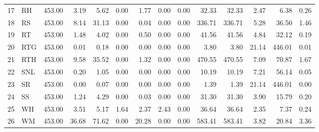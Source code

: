 \begin{table}[ht]
\begin{tabular}{rlrrrrrrrrrrrr}
  17 & RH & 453.00 & 3.19 & 5.62 & 0.00 & 1.77 & 0.00 & 0.00 & 32.33 & 32.33 & 2.47 & 6.38 & 0.26 \\ 
  18 & RS & 453.00 & 8.14 & 31.13 & 0.00 & 0.04 & 0.00 & 0.00 & 336.71 & 336.71 & 5.28 & 36.50 & 1.46 \\ 
  19 & RT & 453.00 & 1.48 & 4.02 & 0.00 & 0.50 & 0.00 & 0.00 & 41.56 & 41.56 & 4.84 & 32.12 & 0.19 \\ 
  20 & RTG & 453.00 & 0.01 & 0.18 & 0.00 & 0.00 & 0.00 & 0.00 & 3.80 & 3.80 & 21.14 & 446.01 & 0.01 \\ 
  21 & RTH & 453.00 & 9.58 & 35.52 & 0.00 & 1.32 & 0.00 & 0.00 & 470.55 & 470.55 & 7.09 & 70.87 & 1.67 \\ 
  22 & SNL & 453.00 & 0.20 & 1.05 & 0.00 & 0.00 & 0.00 & 0.00 & 10.19 & 10.19 & 7.21 & 56.14 & 0.05 \\ 
  23 & SR & 453.00 & 0.00 & 0.07 & 0.00 & 0.00 & 0.00 & 0.00 & 1.39 & 1.39 & 21.14 & 446.01 & 0.00 \\ 
  24 & SS & 453.00 & 1.24 & 4.29 & 0.00 & 0.03 & 0.00 & 0.00 & 31.30 & 31.30 & 3.90 & 15.79 & 0.20 \\ 
  25 & WH & 453.00 & 3.51 & 5.17 & 1.64 & 2.37 & 2.43 & 0.00 & 36.64 & 36.64 & 2.35 & 7.37 & 0.24 \\ 
  26 & WM & 453.00 & 36.68 & 71.62 & 0.00 & 20.28 & 0.00 & 0.00 & 583.41 & 583.41 & 3.82 & 20.84 & 3.36 \\ 
   \hline
\end{tabular}
\end{table}